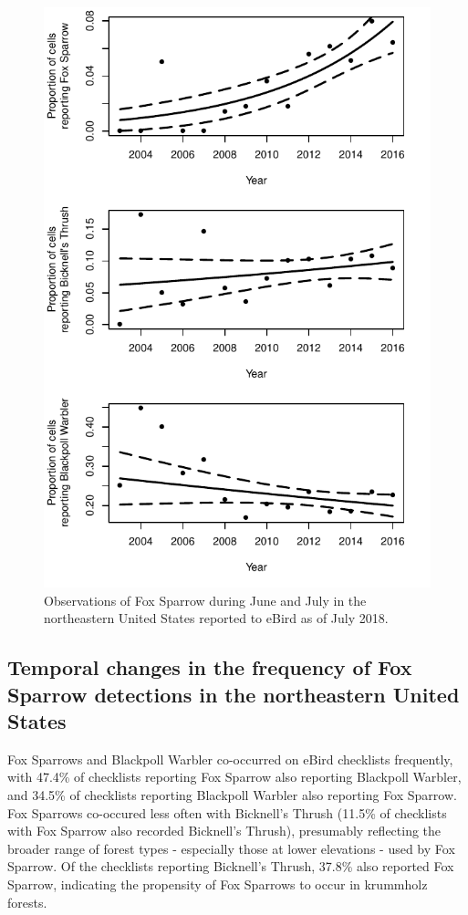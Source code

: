 \documentclass[fleqn,10pt,lineno]{wlpeerj} %
\begin{document}
\begin{figure}[ht]\centering
\includegraphics[width=\linewidth]{Figure2}
\caption{Observations of Fox Sparrow during June and July in the northeastern United States reported to eBird as of July 2018.}
\label{fig:Figure2}
\end{figure}

\subsection*{Temporal changes in the frequency of Fox Sparrow detections in the northeastern United States}
Fox Sparrows and Blackpoll Warbler co-occurred on eBird checklists frequently, with 47.4\% of checklists reporting Fox Sparrow also reporting Blackpoll Warbler, and 34.5\% of checklists reporting Blackpoll Warbler also reporting Fox Sparrow. Fox Sparrows co-occured less often with Bicknell's Thrush (11.5\% of checklists with Fox Sparrow also recorded Bicknell's Thrush), presumably reflecting the broader range of forest types - especially those at lower elevations - used by Fox Sparrow. Of the checklists reporting Bicknell's Thrush, 37.8\% also reported Fox Sparrow, indicating the propensity of Fox Sparrows to occur in krummholz forests. 
\end{document}
